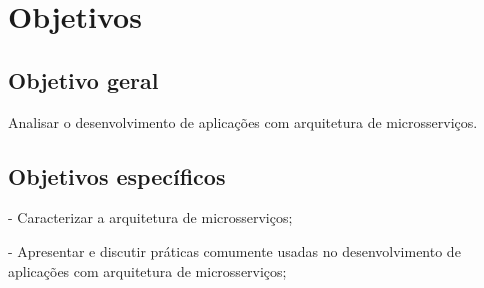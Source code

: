 


\section{Objetivos}\label{sec-objetivos}


\subsection{Objetivo geral}\label{sec-objetivo-geral}

Analisar o desenvolvimento de aplicações com arquitetura de microsserviços.

\subsection{Objetivos específicos}\label{sec-objetivos-especificos}

- Caracterizar a arquitetura de microsserviços;

- Apresentar e discutir práticas comumente usadas no desenvolvimento de aplicações com arquitetura de microsserviços;

